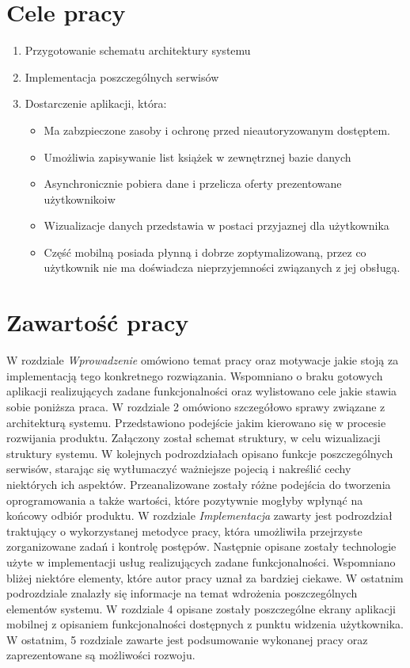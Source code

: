 
\section{Cele pracy}
\label{sec:celePracy}
\begin{enumerate}
    \item Przygotowanie schematu architektury systemu
    \item Implementacja poszczególnych serwisów
    \item Dostarczenie aplikacji, która: 
    \begin{itemize}
        \item Ma zabzpieczone zasoby i ochronę przed nieautoryzowanym dostęptem.
        \item Umożliwia zapisywanie list książek w zewnętrznej bazie danych 
        \item Asynchronicznie pobiera dane i przelicza oferty prezentowane użytkownikoiw
        \item Wizualizacje danych przedstawia w postaci przyjaznej dla użytkownika
        \item Część mobilną posiada płynną i dobrze zoptymalizowaną, przez co użytkownik nie ma doświadcza nieprzyjemności związanych z jej obsługą.
    \end{itemize}
\end{enumerate}

\section{Zawartość pracy}
\label{sec:zawartoscPracy}
W rozdziale \textit{Wprowadzenie} omówiono temat pracy oraz motywacje jakie stoją za implementacją tego konkretnego rozwiązania. Wspomniano o braku gotowych aplikacji realizujących zadane funkcjonalności oraz wylistowano cele jakie stawia sobie poniższa praca.
W rozdziale 2 omówiono szczegółowo sprawy związane z architekturą systemu. Przedstawiono podejście jakim kierowano się w procesie rozwijania produktu. Załączony został schemat struktury, w celu wizualizacji struktury systemu. W kolejnych podrozdziałach opisano funkcje poszczególnych serwisów, starając się wytłumaczyć ważniejsze pojecią i nakreślić cechy niektórych ich aspektów. Przeanalizowane zostały różne podejścia do tworzenia oprogramowania a także wartości, które pozytywnie mogłyby wpłynąć na końcowy odbiór produktu.
W rozdziale \textit{Implementacja} zawarty jest podrozdział traktujący o wykorzystanej metodyce pracy, która umożliwiła przejrzyste zorganizowane zadań i kontrolę postępów. Następnie opisane zostały technologie użyte w implementacji usług realizujących zadane funkcjonalności. Wspomniano bliżej niektóre elementy, które autor pracy uznał za bardziej ciekawe. W ostatnim podrozdziale znalazły się informacje na temat wdrożenia poszczególnych elementów systemu.
W rozdziale 4 opisane zostały poszczególne ekrany aplikacji mobilnej z opisaniem funkcjonalności dostępnych z punktu widzenia użytkownika.
W ostatnim, 5 rozdziale zawarte jest podsumowanie wykonanej pracy oraz zaprezentowane są możliwości rozwoju.
